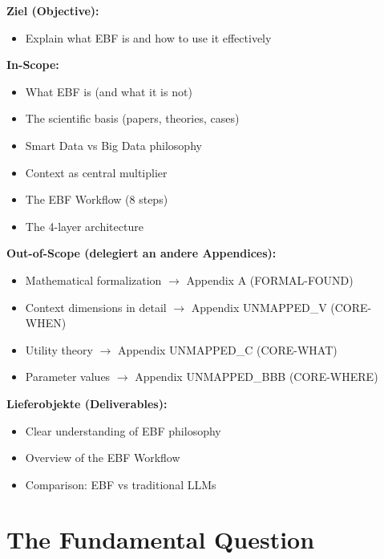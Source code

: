 \begin{tcolorbox}[
    colback=orange!5!white,
    colframe=orange!75!black,
    title={\textbf{Appendix Scope: Ziel / In-Scope / Out-of-Scope / Constraints}},
    fonttitle=\bfseries
]

\textbf{Ziel (Objective):}
\begin{itemize}[nosep]
    \item Explain what EBF is and how to use it effectively
\end{itemize}

\textbf{In-Scope:}
\begin{itemize}[nosep]
    \item What EBF is (and what it is not)
    \item The scientific basis (papers, theories, cases)
    \item Smart Data vs Big Data philosophy
    \item Context as central multiplier
    \item The EBF Workflow (8 steps)
    \item The 4-layer architecture
\end{itemize}

\textbf{Out-of-Scope (delegiert an andere Appendices):}
\begin{itemize}[nosep]
    \item Mathematical formalization $\rightarrow$ Appendix A (FORMAL-FOUND)
    \item Context dimensions in detail $\rightarrow$ Appendix UNMAPPED_V (CORE-WHEN)
    \item Utility theory $\rightarrow$ Appendix UNMAPPED_C (CORE-WHAT)
    \item Parameter values $\rightarrow$ Appendix UNMAPPED_BBB (CORE-WHERE)
\end{itemize}

\textbf{Lieferobjekte (Deliverables):}
\begin{itemize}[nosep]
    \item Clear understanding of EBF philosophy
    \item Overview of the EBF Workflow
    \item Comparison: EBF vs traditional LLMs
\end{itemize}

\end{tcolorbox}


\section{The Fundamental Question}
\label{sec:ref-ebf-fundamental}

